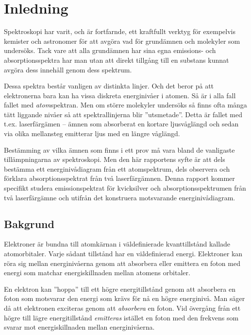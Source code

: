 \documentclass[11pt,a4paper]{article}
\begin{document}





\section{Inledning}
Spektroskopi har varit, och är fortfarnde, ett kraftfullt verktyg för
exempelvis kemister och astronomer för att avgöra vad för grundämnen
och molekyler som undersöks. Tack vare att alla grundämnen har sina
egna emissions- och absorptionsspektra har man utan att direkt
tillgång till en substans kunnat avgöra dess innehåll genom dess
spektrum. 

Dessa spektra består vanligen av distinkta linjer. Och det beror på
att elektronerna bara kan ha vissa diskreta energinivåer i atomen. Så
är i alla fall fallet med \emph{atom}spektran. Men om större molekyler
undersöks så finns ofta många tätt liggande nivåer så att
spektrallinjerna blir ''utsmetade''. Detta är fallet med
t.ex. laserfärgämen -- ämnen som absorberat en kortare ljusvåglängd
och sedan via olika mellansteg emitterar ljus med en längre våglängd.

Bestämming av vilka ämnen som finns i ett prov må vara bland de
vanligaste tillämpningarna av spektroskopi. Men den här rapportens
syfte är att dels bestämma ett energinivådiagram från ett
atomspektrum, dels observera och förklara absorptionsspektrat från två
laserfärgämnen.  Denna rapport kommer specifikt studera
emissionspektrat för kvicksilver\footnotemark{} och
absorptionsspektrumen från två laserfärgämne och utifrån det
konstruera motsvarande energinivådiagram. 


\subsection{Bakgrund}
Elektroner är bundna till atomkärnan i väldefinierade kvanttillstånd
kallade atomorbitaler. Varje sådant tillstånd har en väldefinierad
energi. Elektroner kan röra sig mellan energinivåerna genom att
absorbera eller emittera en foton med energi som matchar 
energiskillnaden mellan atomens orbitaler. 

En elektron kan ''hoppa'' till ett högre energitillstånd genom att absorbera en foton
som motsvarar den energi som krävs för nå en högre energinivå. Man
säger då att elektronen exciteras genom att \emph{absorbera} en
foton. Vid övergång från ett högre till lägre energitillstånd
\emph{emitteras} istället en foton med den frekvens som svarar mot
energiskillnaden mellan energinivåerna. 
 
\end{document}
